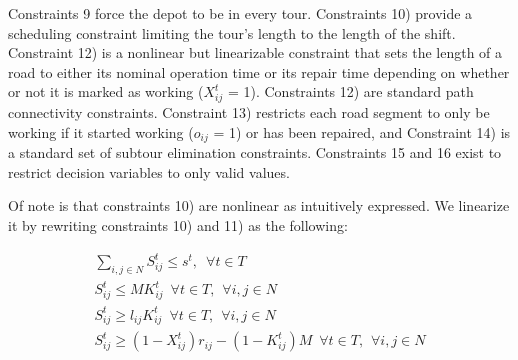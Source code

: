 \documentclass{article}
\begin{document}
Constraints 9 force the depot to be in every tour. Constraints 10) provide a scheduling constraint limiting the tour's length to the length of the shift. Constraint 12) is a nonlinear but linearizable constraint that sets the length of a road to either its nominal operation time or its repair time depending on whether or not it is marked as working ($X_{ij}^t$ = 1). Constraints 12) are standard path connectivity constraints. Constraint 13) restricts each road segment to only be working if it started working ($o_{ij}$ = 1) or has been repaired, and Constraint 14) is a standard set of subtour elimination constraints. Constraints 15 and 16 exist to restrict decision variables to only valid values.

Of note is that constraints 10) are nonlinear as intuitively expressed. We linearize it by rewriting constraints 10) and 11) as the following:

\begin{eqnarray}
\sum_{i,j \in N} S_{ij}^t \leq s^t, \hspace{6pt} \forall t\in T \\
S_{ij}^t \leq MK_{ij}^t \hspace{6pt} \forall t\in T, \hspace{5pt} \forall i,j \in N\\
S_{ij}^t \geq l_{ij}K_{ij}^t \hspace{6pt} \forall t\in T, \hspace{5pt} \forall i,j \in N\\
S_{ij}^t \geq (1-X_{ij}^t)r_{ij} - (1-K_{ij}^t)M \hspace{6pt} \forall t\in T, \hspace{5pt} \forall i,j \in N
\end{eqnarray}
\end{document}

